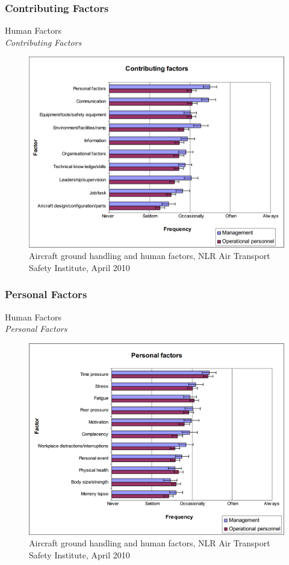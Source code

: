 \subsubsection{Contributing Factors}
\begin{frame}{Human Factors\\\textit{Contributing Factors}}{}
	\begin{figure}[H]
	\centering
	\includegraphics[width=\textwidth]{Grafik/ContributingFactors}
	\caption{Aircraft ground handling and human factors, NLR Air Transport Safety Institute, April 2010}
\end{figure}
\end{frame}

\subsubsection{Personal Factors}
\begin{frame}{Human Factors\\\textit{Personal Factors}}{}
	\begin{figure}[H]
	\centering
	\includegraphics[width=\textwidth]{Grafik/PersonalFactors}
	\caption{Aircraft ground handling and human factors, NLR Air Transport Safety Institute, April 2010}
\end{figure}
\end{frame}

